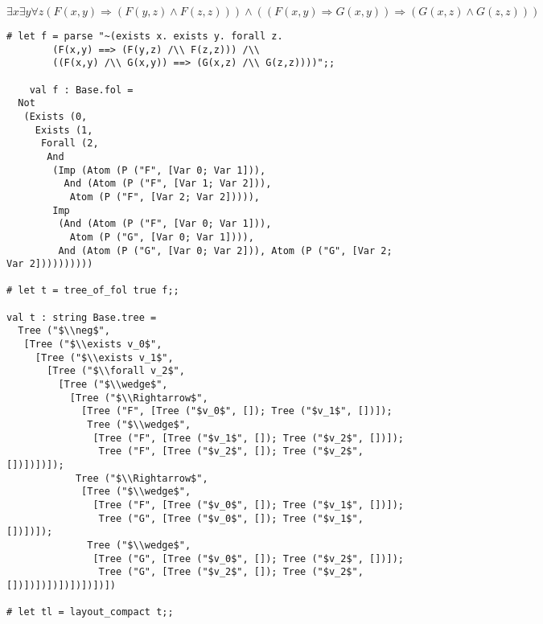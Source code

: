 \documentclass[a4paper]{article}
\begin{document}
\[\exists x \exists y \forall z
  (F(x,y) \Rightarrow (F(y,z) \wedge F(z,z))) \wedge
  ((F(x,y) \Rightarrow G(x,y)) \Rightarrow (G(x,z) \wedge G(z,z)))\]

\begin{lstlisting}[title=interpréteur, name=interp]
# let f = parse "~(exists x. exists y. forall z.
        (F(x,y) ==> (F(y,z) /\\ F(z,z))) /\\
        ((F(x,y) /\\ G(x,y)) ==> (G(x,z) /\\ G(z,z))))";;

    val f : Base.fol =
  Not
   (Exists (0,
     Exists (1,
      Forall (2,
       And
        (Imp (Atom (P ("F", [Var 0; Var 1])),
          And (Atom (P ("F", [Var 1; Var 2])),
           Atom (P ("F", [Var 2; Var 2])))),
        Imp
         (And (Atom (P ("F", [Var 0; Var 1])),
           Atom (P ("G", [Var 0; Var 1]))),
         And (Atom (P ("G", [Var 0; Var 2])), Atom (P ("G", [Var 2; Var 2])))))))))

# let t = tree_of_fol true f;;

val t : string Base.tree =
  Tree ("$\\neg$",
   [Tree ("$\\exists v_0$",
     [Tree ("$\\exists v_1$",
       [Tree ("$\\forall v_2$",
         [Tree ("$\\wedge$",
           [Tree ("$\\Rightarrow$",
             [Tree ("F", [Tree ("$v_0$", []); Tree ("$v_1$", [])]);
              Tree ("$\\wedge$",
               [Tree ("F", [Tree ("$v_1$", []); Tree ("$v_2$", [])]);
                Tree ("F", [Tree ("$v_2$", []); Tree ("$v_2$", [])])])]);
            Tree ("$\\Rightarrow$",
             [Tree ("$\\wedge$",
               [Tree ("F", [Tree ("$v_0$", []); Tree ("$v_1$", [])]);
                Tree ("G", [Tree ("$v_0$", []); Tree ("$v_1$", [])])]);
              Tree ("$\\wedge$",
               [Tree ("G", [Tree ("$v_0$", []); Tree ("$v_2$", [])]);
                Tree ("G", [Tree ("$v_2$", []); Tree ("$v_2$", [])])])])])])])])])

# let tl = layout_compact t;;


\end{lstlisting}
\end{document}
